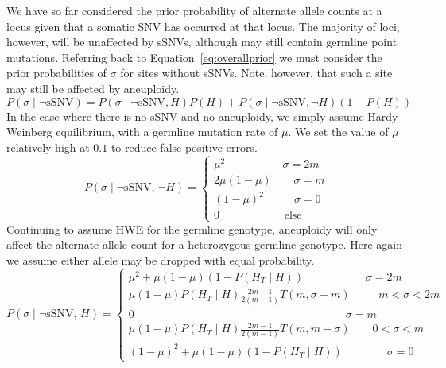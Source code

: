 \documentclass[../../main.tex]{subfiles}
\begin{document}
We have so far considered the prior probability of alternate allele counts at a locus given that a somatic SNV has occurred at that locus. The majority of loci, however, will be unaffected by sSNVs, although may still contain germline point mutations. Referring back to Equation~\eqref{eq:overallprior} we must consider the prior probabilities of $\sigma$ for sites without sSNVs. Note, however, that such a site may still be affected by aneuploidy.
\begin{equation}
P(\sigma\mid\neg\text{sSNV})=P(\sigma\mid\neg\text{sSNV},H)P(H)+P(\sigma\mid\neg\text{sSNV},\neg H)(1-P(H))
\end{equation} 
In the case where there is no sSNV and no aneuploidy, we simply assume Hardy-Weinberg equilibrium, with a germline mutation rate of $\mu$. We set the value of $\mu$ relatively high at $0.1$ to reduce false positive errors.
\begin{equation*}
P(\sigma\mid\neg\text{sSNV},\,\neg H) = \begin{cases} \mu^2\qquad\qquad\quad\,\sigma=2m\\ 2\mu(1-\mu) \qquad \sigma = m \\ (1-\mu)^2 \qquad \; \;\, \sigma=0 \\ 0 \qquad\qquad\quad\;\;\; \text{else} \end{cases}
\end{equation*}
Continuing to assume HWE for the germline genotype, aneuploidy will only affect the alternate allele count for a heterozygous germline genotype. Here again we assume either allele may be dropped with equal probability.
\begin{equation*}
P(\sigma\mid\neg\text{sSNV},\, H) = \begin{cases} \mu^2 + \mu(1-\mu)(1-P(H_T\mid H))\qquad\qquad\quad\;\; \sigma=2m\\
\mu(1-\mu)P(H_T\mid H)\frac{2m-1}{2(m-1)}T(m,\sigma-m) \qquad\;\; m<\sigma<2m\\
0 \qquad\qquad\qquad\qquad\qquad\qquad\qquad\qquad\qquad\quad \sigma=m \\
\mu(1-\mu)P(H_T\mid H)\frac{2m-1}{2(m-1)}T(m,m-\sigma) \qquad 0<\sigma<m\\
(1-\mu)^2 + \mu(1-\mu)(1-P(H_T\mid H)) \qquad\qquad \sigma=0 \end{cases}
\end{equation*}
\end{document}
